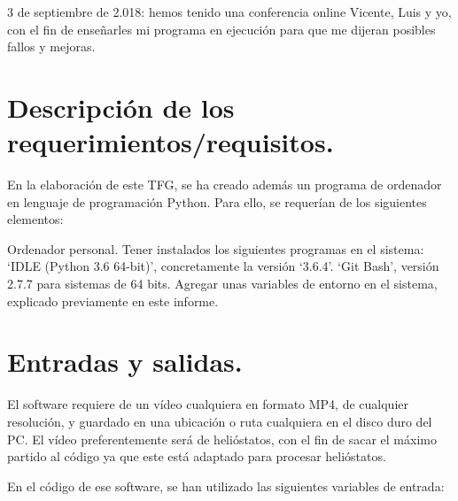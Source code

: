 \documentclass[12pt]{article}
\begin{document}
3 de septiembre de 2.018: hemos tenido una conferencia online Vicente, Luis y yo, con el fin de enseñarles mi programa en ejecución para que me dijeran posibles fallos y mejoras.





\section{Descripción de los requerimientos/requisitos.}

En la elaboración de este TFG, se ha creado además un programa de ordenador en lenguaje de programación Python. Para ello, se requerían de los siguientes elementos:

Ordenador personal.
Tener instalados los siguientes programas en el sistema:
‘IDLE (Python 3.6 64-bit)’, concretamente la versión ‘3.6.4’.
‘Git Bash’, versión 2.7.7 para sistemas de 64 bits.
Agregar unas variables de entorno en el sistema, explicado previamente en este informe.


\section{Entradas y salidas.}

El software requiere de un vídeo cualquiera en formato MP4, de cualquier resolución, y guardado en una ubicación o ruta cualquiera en el disco duro del PC. El vídeo preferentemente será de helióstatos, con el fin de sacar el máximo partido al código ya que este está adaptado para procesar helióstatos.

En el código de ese software, se han utilizado las siguientes variables de entrada:
\end{document}
